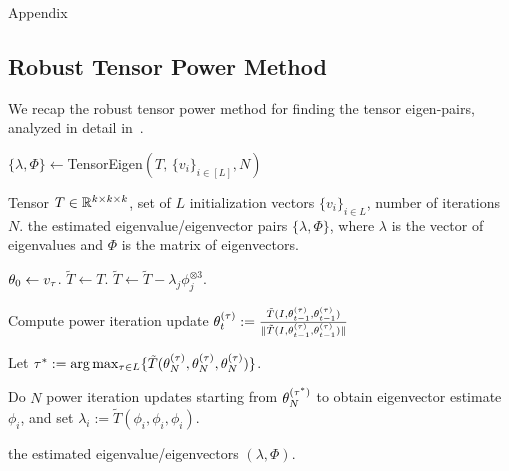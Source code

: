 \clearpage
\newpage

\onecolumn

\begin{center}
{\Large Appendix}
\end{center}

\subsection{Robust Tensor Power Method}
We recap the robust tensor power method for finding the tensor eigen-pairs, analyzed in detail in~\cite{AnandkumarEtal:community12}. 

\begin{algorithm}
\caption{$\{\lambda, \Phi\}\leftarrow $TensorEigen$(T,\, \{v_i\}_{i\in [L]}, N)$}\label{alg:robustpower}
\begin{algorithmic}
\renewcommand{\algorithmicrequire}{\textbf{Input: }}
\renewcommand{\algorithmicensure}{\textbf{Output: }}
\REQUIRE Tensor $T\in \mathbb{R}^{k \times k \times k}$, set of $L$ initialization vectors $\{v_i\}_{i\in L}$, number of
iterations  $N$.
\ENSURE the estimated eigenvalue/eigenvector pairs $\{\lambda, \Phi\}$, where $\lambda$ is the vector of eigenvalues and $\Phi$ is the matrix of eigenvectors.

\STATE $\theta_{0}\leftarrow v_\tau$.
\STATE $\tilde{T}\leftarrow T$.
\STATE $\tilde{T}\leftarrow \tilde{T}- \lambda_j \phi_j^{\otimes 3}$.
\ENDIF
\ENDFOR

\STATE Compute power iteration update
$
\theta_{t}^{(\tau)}  :=
\frac{\tilde{T}(I, \theta_{t-1}^{(\tau)}, \theta_{t-1}^{(\tau)})}
{\|\tilde{T}(I, \theta_{t-1}^{(\tau)}, \theta_{t-1}^{(\tau)})\|}
$\ENDFOR
\ENDFOR

\STATE Let $\tau^* := \arg\max_{\tau \in L} \{ \tilde{T}(\theta_{N}^{(\tau)},
\theta_{N}^{(\tau)}, \theta_{N}^{(\tau)}) \}$.

\STATE Do $N$ power iteration updates starting from
$\theta_{N}^{(\tau^*)}$ to obtain eigenvector estimate $\phi_i$, and set $\lambda_i :=
\tilde{T}(\phi_i, \phi_i, \phi_i)$.

\ENDFOR
\RETURN the estimated eigenvalue/eigenvectors
$(\lambda, \Phi)$.

\end{algorithmic}
\end{algorithm}

